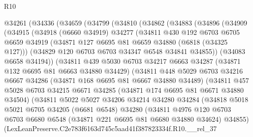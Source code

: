 \begin{lexlean}{R10}
\begin{coremodule}
  @34261
    (@34336
      (@34659
        (@34799
          (@34810
            (@34862
              (@34883
                (@34896
                  (@34909
                    (@34915
                      (@34918
                        (@6660 @34919)
                        @34277
                        (@34811
                          @430
                          @192
                          @6703
                          @6705
                          @6659
                          @34919
                          (@34871 @127 @6695 @81 @6659 @34880 (@6818 (@34325 @127)))
                          (@34829 @120 @6703 @6703 @34347 @6548 @34841 @34855))
                        (@34083 @6658 @34194))
                      (@34811
                        @439
                        @5030
                        @6703
                        @34217
                        @6663
                        @34287
                        (@34871 @132 @6695 @81 @6663 @34880 @34429)
                        (@34811
                          @448
                          @5029
                          @6703
                          @34216
                          @6667
                          @34286
                          (@34871 @168 @6695 @81 @6667 @34880 @34489)
                          (@34811
                            @457
                            @5028
                            @6703
                            @34215
                            @6671
                            @34285
                            (@34871 @174 @6695 @81 @6671 @34880 @34504)
                            (@34811
                              @5022
                              @5027
                              @34206
                              @34214
                              @34280
                              @34284
                              (@34818
                                @5018
                                @5021
                                @6705
                                @34205
                                (@6681 @6548)
                                @34280
                                (@34811
                                  @4976
                                  @120
                                  @6703
                                  @6703
                                  @6680
                                  @6548
                                  (@34871 @221 @6695 @81 @6680 @34880 @34624)
                                  @34855)
                                (LexLeanPreserve.C2e783f6163d745c5aad41f387823334f.R10.__rel_37

\end{coremodule}
\end{lexlean}
